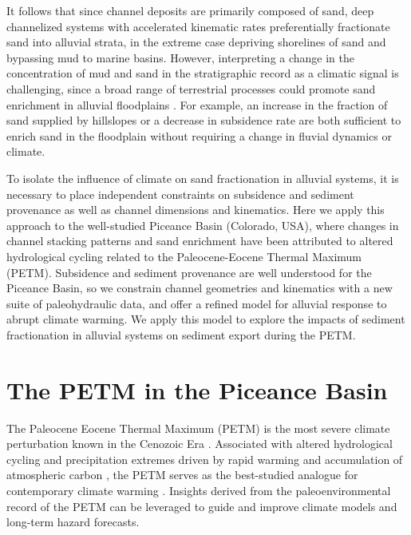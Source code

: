 \documentclass[draft]{compact_proposal}\usepackage[]{graphicx}\usepackage[]{color}
\begin{document}
It follows that since channel deposits are primarily composed of sand, deep channelized systems with accelerated kinematic rates preferentially fractionate sand into alluvial strata, in the extreme case depriving shorelines of sand and bypassing mud to marine basins.
However, interpreting a change in the concentration of mud and sand in the stratigraphic record as a climatic signal is challenging, since a broad range of terrestrial processes could promote sand enrichment in alluvial floodplains \parencite{wright_sequence_1993, straub_influence_2013, allen_studies_1978}.
For example, an increase in the fraction of sand supplied by hillslopes or a decrease in subsidence rate are both sufficient to enrich sand in the floodplain without requiring a change in fluvial dynamics or climate.

To isolate the influence of climate on sand fractionation in alluvial systems, it is necessary to place independent constraints on subsidence and sediment provenance as well as channel dimensions and kinematics.
Here we apply this approach to the well-studied Piceance Basin (Colorado, USA), where changes in channel stacking patterns and sand enrichment have been attributed to altered hydrological cycling related to the Paleocene-Eocene Thermal Maximum (PETM).
Subsidence and sediment provenance are well understood for the Piceance Basin, so we constrain channel geometries and kinematics with a new suite of paleohydraulic data, and offer a refined model for alluvial response to abrupt climate warming. We apply this model to explore the impacts of sediment fractionation in alluvial systems on sediment export during the PETM.

\section{The PETM in the Piceance Basin}

The Paleocene Eocene Thermal Maximum (PETM) is the most severe climate perturbation known in the Cenozoic Era \parencite{zachos_early_2008, slotnick_large_2012}.
Associated with altered hydrological cycling and precipitation extremes driven by rapid warming and accumulation of atmospheric carbon \parencite{carmichael_hydrological_2017}, the PETM serves as the best-studied analogue for contemporary climate warming \parencite{mcinerney_paleocene-eocene_2011}.
Insights derived from the paleoenvironmental record of the PETM can be leveraged to guide and improve climate models and long-term hazard forecasts.
\end{document}
